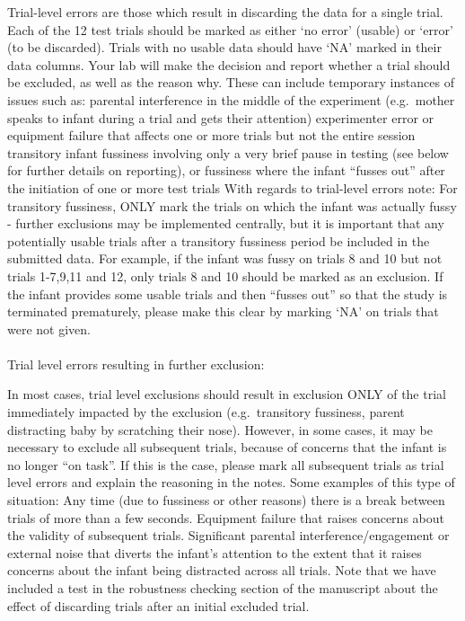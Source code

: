 \documentclass[
  letterpaper,
  DIV=11,
  numbers=noendperiod,
  oneside]{scrreprt}
\makeatletter
\let\oldparagraph\paragraph
\renewcommand{\paragraph}{
    \@ifstar
      \xxxParagraphStar
      \xxxParagraphNoStar
  }
\newcommand{\xxxParagraphStar}[1]{\oldparagraph*{#1}\mbox{}}
\newcommand{\xxxParagraphNoStar}[1]{\oldparagraph{#1}\mbox{}}
\makeatother
\begin{document}
Trial-level errors are those which result in discarding the data for a
single trial. Each of the 12 test trials should be marked as either `no
error' (usable) or `error' (to be discarded). Trials with no usable data
should have `NA' marked in their data columns. Your lab will make the
decision and report whether a trial should be excluded, as well as the
reason why. These can include temporary instances of issues such as:
parental interference in the middle of the experiment (e.g.~mother
speaks to infant during a trial and gets their attention) experimenter
error or equipment failure that affects one or more trials but not the
entire session transitory infant fussiness involving only a very brief
pause in testing (see below for further details on reporting), or
fussiness where the infant ``fusses out'' after the initiation of one or
more test trials With regards to trial-level errors note: For transitory
fussiness, ONLY mark the trials on which the infant was actually fussy -
further exclusions may be implemented centrally, but it is important
that any potentially usable trials after a transitory fussiness period
be included in the submitted data. For example, if the infant was fussy
on trials 8 and 10 but not trials 1-7,9,11 and 12, only trials 8 and 10
should be marked as an exclusion. If the infant provides some usable
trials and then ``fusses out'' so that the study is terminated
prematurely, please make this clear by marking `NA' on trials that were
not given.

\paragraph{Trial level errors resulting in further
exclusion:}\label{trial-level-errors-resulting-in-further-exclusion}

In most cases, trial level exclusions should result in exclusion ONLY of
the trial immediately impacted by the exclusion (e.g.~transitory
fussiness, parent distracting baby by scratching their nose). However,
in some cases, it may be necessary to exclude all subsequent trials,
because of concerns that the infant is no longer ``on task''. If this is
the case, please mark all subsequent trials as trial level errors and
explain the reasoning in the notes. Some examples of this type of
situation: Any time (due to fussiness or other reasons) there is a break
between trials of more than a few seconds. Equipment failure that raises
concerns about the validity of subsequent trials. Significant parental
interference/engagement or external noise that diverts the infant's
attention to the extent that it raises concerns about the infant being
distracted across all trials. Note that we have included a test in the
robustness checking section of the manuscript about the effect of
discarding trials after an initial excluded trial.
\end{document}
